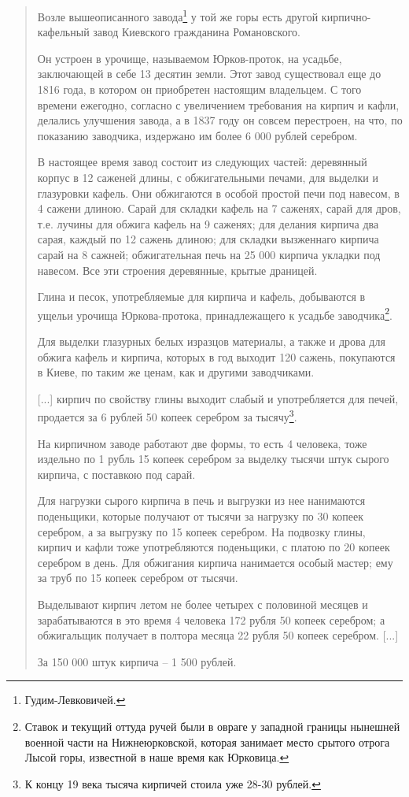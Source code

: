 \begin{quotation}
Возле вышеописанного завода\footnote{Гудим-Левковичей.} у той же горы есть другой кирпично-кафельный завод Киевского гражданина Романовского. 

Он устроен в урочище, называемом Юрков-проток, на усадьбе, заключающей в себе 13 десятин земли. Этот завод существовал еще до 1816 года, в котором он приобретен настоящим владельцем. С того времени ежегодно, согласно с увеличением требования на кирпич и кафли, делались улучшения завода, а в 1837 году он совсем перестроен, на что, по показанию заводчика, издержано им более 6 000 рублей серебром.

В настоящее время завод состоит из следующих частей: деревянный корпус в 12 саженей длины, с обжигательными печами, для выделки и глазуровки кафель. Они обжигаются в особой простой печи под навесом, в 4 сажени длиною. Сарай для складки кафель на 7 саженях, сарай для дров, т.е. лучины для обжига кафель на 9 саженях; для делания кирпича два сарая, каждый по 12 сажень длиною; для складки вызженнаго кирпича сарай на 8 сажней; обжигательная печь на 25 000 кирпича укладки под навесом. Все эти строения деревянные, крытые драницей.

Глина и песок, употребляемые для кирпича и кафель, добываются в ущельи урочища Юркова-протока, принадлежащего к усадьбе заводчика\footnote{Ставок и текущий оттуда ручей были в овраге у западной границы нынешней военной части на Нижнеюрковской, которая занимает место срытого отрога Лысой горы, известной в наше время как Юрковица.}.

Для выделки глазурных белых изразцов материалы, а также и дрова для обжига кафель и кирпича, которых в год выходит 120 сажень, покупаются в Киеве, по таким же ценам, как и другими заводчиками.

[...] кирпич по свойству глины выходит слабый и употребляется для печей, продается за 6 рублей 50 копеек серебром за тысячу\footnote{К концу 19 века тысяча кирпичей стоила уже 28-30 рублей.}.

На кирпичном заводе работают две формы, то есть 4 человека, тоже издельно по 1 рубль 15 копеек серебром за выделку тысячи штук сырого кирпича, с поставкою под сарай.

Для нагрузки сырого кирпича в печь и выгрузки из нее нанимаются поденьщики, которые получают от тысячи за нагрузку по 30 копеек серебром, а за выгрузку по 15 копеек серебром. На подвозку глины, кирпич и кафли тоже употребляются поденьщики, с платою по 20 копеек серебром в день. Для обжигания кирпича нанимается особый мастер; ему за труб по 15 копеек серебром от тысячи.

Выделывают кирпич летом не более четырех с половиной месяцев и зарабатываются в это время 4 человека 172 рубля 50 копеек серебром; а обжигальщик получает в полтора месяца 22 рубля 50 копеек серебром. [...]

За 150 000 штук кирпича – 1 500 рублей.
\end{quotation}

